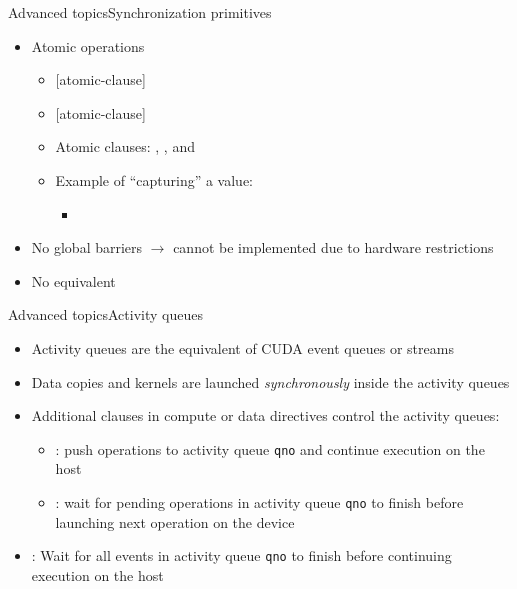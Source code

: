 \documentclass[12pt,aspectratio=169]{beamer}
\begin{document}
\begin{frame}[fragile]{Advanced topics}{Synchronization primitives}
  \begin{itemize}
  \item Atomic operations
    \begin{itemize}
    \item {} [atomic-clause]
    \item {} [atomic-clause]
    \item Atomic clauses: , ,
       and 
    \item Example of ``capturing'' a value:
      \begin{itemize}
      \item {}
      \end{itemize}
    \end{itemize}
  \item No global barriers $\rightarrow$ cannot be implemented due to hardware restrictions
  \item No equivalent 
  \end{itemize}
\end{frame}

\begin{frame}[fragile]{Advanced topics}{Activity queues}
  \begin{itemize}
  \item Activity queues are the equivalent of CUDA event queues or streams
  \item Data copies and kernels are launched \emph{synchronously} inside the activity queues
  \item Additional clauses in compute or data directives control the activity queues:
    \begin{itemize}
    \item {}: push operations to activity queue \texttt{qno} and continue execution on the host
    \item {}: wait for pending operations in activity queue \texttt{qno} to finish before launching next operation on the device
    \end{itemize}
  \item {}: Wait for all events in activity queue \texttt{qno} to finish before continuing execution on the host
  \end{itemize}
\end{frame}
\end{document}
